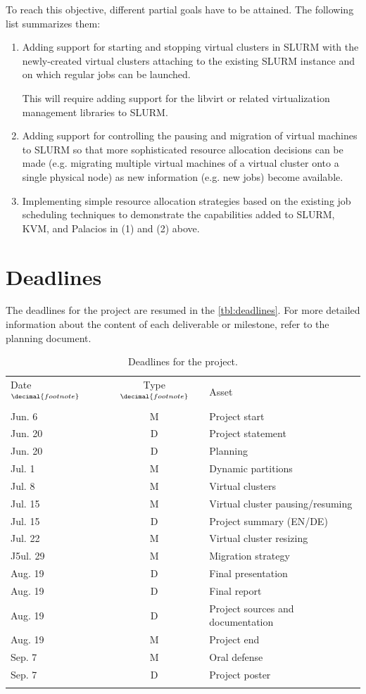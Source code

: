 \documentclass[10pt,authoryear]{sigplanconf} %
\newcommand{\row}{\\\noalign{\smallskip}}
\begin{document}
To reach this objective, different partial goals have to be attained. The following list summarizes them:

\begin{enumerate}
\item Adding support for starting and stopping virtual clusters in SLURM with the newly-created virtual clusters attaching to the existing SLURM instance and on which regular jobs can be launched.

This will require adding support for the libvirt or related virtualization management libraries to SLURM.

\item Adding support for controlling the pausing and migration of virtual machines to SLURM so that more sophisticated resource allocation decisions can be made (e.g. migrating multiple virtual machines of a virtual cluster onto a single physical node) as new information (e.g. new jobs) become available.

\item Implementing simple resource allocation strategies based on the existing job scheduling techniques to demonstrate the capabilities added to SLURM, KVM, and Palacios in (1) and (2) above.
\end{enumerate}


\section{Deadlines}

The deadlines for the project are resumed in the \autoref{tbl:deadlines}. For more detailed information about the content of each deliverable or milestone, refer to the planning document.

\addtocounter{footnote}{1}
\footnotetext[\value{footnote}]{All dates refer to 2011}

\addtocounter{footnote}{1}
\footnotetext[\value{footnote}]{M=Milestone, D=Deliverable}
\addtocounter{footnote}{-1}

\begin{table}[ht]
\begin{tabularx}{\columnwidth}{ l c X }
\toprule\noalign{\smallskip}
Date$^{\decimal{footnote}}$ \addtocounter{footnote}{1}& Type$^{\decimal{footnote}}$ & Asset
\row\hline\hline\noalign{\smallskip}\noalign{\smallskip}
Jun. 6 & M & Project start 
\row
Jun. 20 & D & Project statement
\row
Jun. 20 & D & Planning
\row
Jul. 1 & M & Dynamic partitions
\row
Jul. 8 & M & Virtual clusters
\row
Jul. 15 & M & Virtual cluster pausing/resuming
\row
Jul. 15 & D & Project summary (EN/DE)
\row
Jul. 22 & M & Virtual cluster resizing
\row
J5ul. 29 & M & Migration strategy
\row
Aug. 19 & D & Final presentation
\row
Aug. 19 & D & Final report
\row
Aug. 19 & D & Project sources and documentation
\row
Aug. 19 & M & Project end
\row
Sep. 7 & M & Oral defense
\row
Sep. 7 & D & Project poster
\row
\bottomrule
\end{tabularx}

\nocaptionrule\caption{Deadlines for the project.}
\label{tbl:deadlines}

\end{table}
\end{document}
